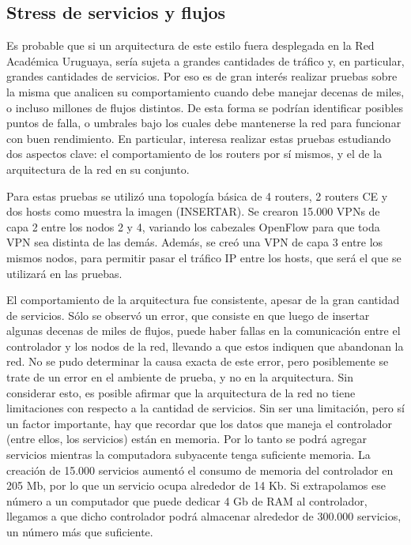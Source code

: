 \documentclass[a4paper,12pt]{report}
\begin{document}
\subsection{Stress de servicios y flujos}
Es probable que si un arquitectura de este estilo fuera desplegada en la Red Académica Uruguaya, sería sujeta a grandes cantidades de tráfico y, en particular, grandes cantidades de servicios. Por eso es de gran interés realizar pruebas sobre la misma que analicen su comportamiento cuando debe manejar decenas de miles, o incluso millones de flujos distintos. De esta forma se podrían identificar posibles puntos de falla, o umbrales bajo los cuales debe mantenerse la red para funcionar con buen rendimiento.
En particular, interesa realizar estas pruebas estudiando dos aspectos clave: el comportamiento de los routers por sí mismos, y el de la arquitectura de la red en su conjunto.

Para estas pruebas se utilizó una topología básica de 4 routers, 2 routers CE y dos hosts como muestra la imagen (INSERTAR). Se crearon 15.000 VPNs de capa 2 entre los nodos 2 y 4, variando los cabezales OpenFlow para que toda VPN sea distinta de las demás. Además, se creó una VPN de capa 3 entre los mismos nodos, para permitir pasar el tráfico IP entre los hosts, que será el que se utilizará en las pruebas.

El comportamiento de la arquitectura fue consistente, apesar de la gran cantidad de servicios. Sólo se observó un error, que consiste en que luego de insertar algunas decenas de miles de flujos, puede haber fallas en la comunicación entre el controlador y los nodos de la red, llevando a que estos indiquen que abandonan la red. No se pudo determinar la causa exacta de este error, pero posiblemente se trate de un error en el ambiente de prueba, y no en la arquitectura. Sin considerar esto, es posible afirmar que la arquitectura de la red no tiene limitaciones con respecto a la cantidad de servicios. Sin ser una limitación, pero sí un factor importante, hay que recordar que los datos que maneja el controlador (entre ellos, los servicios) están en memoria. Por lo tanto se podrá agregar servicios mientras la computadora subyacente tenga suficiente memoria. La creación de 15.000 servicios aumentó el consumo de memoria del controlador en 205 Mb, por lo que un servicio ocupa alrededor de 14 Kb. Si extrapolamos ese número a un computador que puede dedicar 4 Gb de RAM al controlador, llegamos a que dicho controlador podrá almacenar alrededor de 300.000 servicios, un número más que suficiente.
\end{document}
